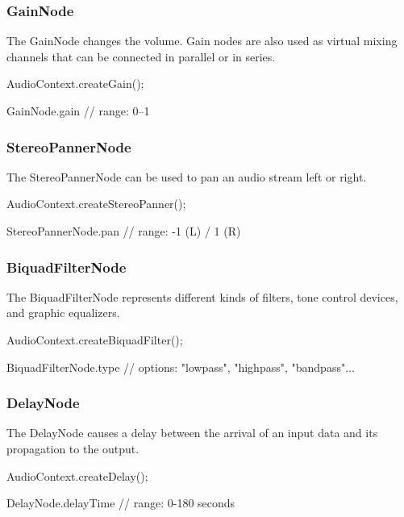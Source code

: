 \documentclass[screen, aspectratio=43]{beamer}
\begin{document}
%
\begin{frame}
\frametitle{GainNode}
The \textrm{GainNode} changes the volume. Gain nodes are also used as virtual mixing channels that can be connected in parallel or in series.\\
\vspace{10 mm}
\centerline{\textrm{AudioContext.createGain();}}
\vspace{2 mm}
\centerline{\textrm{GainNode.gain // range: 0--1}}
\vspace{10 mm}
\end{frame}
%
\begin{frame}
\frametitle{StereoPannerNode}
The \textrm{StereoPannerNode} can be used to pan an audio stream left or right.\\
\vspace{10 mm}
\centerline{\textrm{AudioContext.createStereoPanner();}}
\vspace{2 mm}
\centerline{\textrm{StereoPannerNode.pan // range: -1 (L) / 1 (R)}}
\vspace{10 mm}
\end{frame}
%
\begin{frame}
\frametitle{BiquadFilterNode}
The \textrm{BiquadFilterNode} represents different kinds of filters, tone control devices, and graphic equalizers.\\
\vspace{10 mm}
\centerline{\textrm{AudioContext.createBiquadFilter();}}
\vspace{2 mm}
\centerline{\textrm{BiquadFilterNode.type // options: "lowpass", "highpass", "bandpass"...}}
\vspace{10 mm}
\end{frame}
%
\begin{frame}
\frametitle{DelayNode}
The \textrm{DelayNode} causes a delay between the arrival of an input data and its propagation to the output.\\
\vspace{10 mm}
\centerline{\textrm{AudioContext.createDelay();}}
\vspace{2 mm}
\centerline{\textrm{DelayNode.delayTime // range: 0-180 seconds}}
\vspace{10 mm}
\end{frame}
\end{document}
